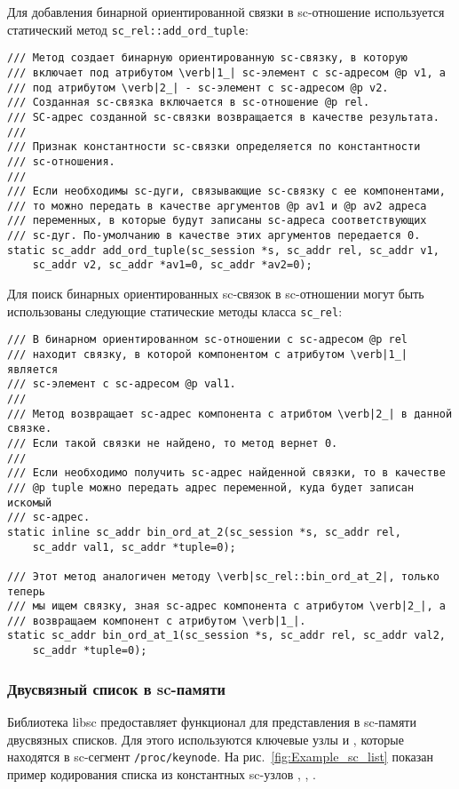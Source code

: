 Для добавления бинарной ориентированной связки в sc-отношение
используется статический метод \lstinline|sc_rel::add_ord_tuple|:
\begin{lstlisting}[texcl]
/// Метод создает бинарную ориентированную sc-связку, в которую
/// включает под атрибутом \verb|1_| sc-элемент с sc-адресом @p v1, а
/// под атрибутом \verb|2_| - sc-элемент с sc-адресом @p v2.
/// Созданная sc-связка включается в sc-отношение @p rel.
/// SC-адрес созданной sc-связки возвращается в качестве результата.
///
/// Признак константности sc-связки определяется по константности
/// sc-отношения.
///
/// Если необходимы sc-дуги, связывающие sc-связку с ее компонентами,
/// то можно передать в качестве аргументов @p av1 и @p av2 адреса
/// переменных, в которые будут записаны sc-адреса соответствующих
/// sc-дуг. По-умолчанию в качестве этих аргументов передается 0.
static sc_addr add_ord_tuple(sc_session *s, sc_addr rel, sc_addr v1,
    sc_addr v2, sc_addr *av1=0, sc_addr *av2=0);
\end{lstlisting}

Для поиск бинарных ориентированных sc-связок в sc-отношении могут быть
использованы следующие статические методы класса \lstinline|sc_rel|:
\begin{lstlisting}[texcl]
/// В бинарном ориентированном sc-отношении с sc-адресом @p rel
/// находит связку, в которой компонентом с атрибутом \verb|1_| является
/// sc-элемент с sc-адресом @p val1.
///
/// Метод возвращает sc-адрес компонента с атрибтом \verb|2_| в данной связке.
/// Если такой связки не найдено, то метод вернет 0.
///
/// Если необходимо получить sc-адрес найденной связки, то в качестве
/// @p tuple можно передать адрес переменной, куда будет записан искомый
/// sc-адрес.
static inline sc_addr bin_ord_at_2(sc_session *s, sc_addr rel,
    sc_addr val1, sc_addr *tuple=0);

/// Этот метод аналогичен методу \verb|sc_rel::bin_ord_at_2|, только теперь
/// мы ищем связку, зная sc-адрес компонента с атрибутом \verb|2_|, а
/// возвращаем компонент с атрибутом \verb|1_|.
static sc_addr bin_ord_at_1(sc_session *s, sc_addr rel, sc_addr val2,
    sc_addr *tuple=0);
\end{lstlisting}

\subsubsection{Двусвязный список в sc-памяти}
\label{sec:libsc_sc_list}

Библиотека libsc предоставляет функционал для представления в
sc-памяти двусвязных списков. Для этого используются ключевые узлы
 и , которые находятся в
sc-сегмент \verb|/proc/keynode|. На рис.~\ref{fig:Example_sc_list}
показан пример кодирования списка из константных sc-узлов ,
, .


